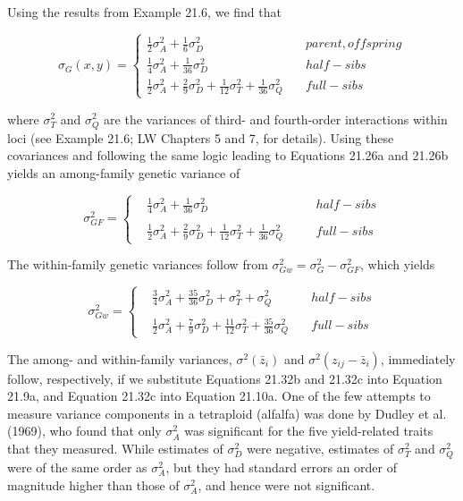 \documentclass{article}
\begin{document}
Using the results from Example 21.6, we find that

\begin{equation}
\sigma_{G}(x,y)=\left\{\begin{array}{ll}\frac{1}{2}\sigma_{A}^{2}+\frac{1}{6}\sigma_{D}^{2}&\quad parent,offspring\\\frac{1}{4}\sigma_{A}^{2}+\frac{1}{36}\sigma_{D}^{2}&\quad half-sibs\\\frac{1}{2}\sigma_{A}^{2}+\frac{2}{9}\sigma_{D}^{2}+\frac{1}{12}\sigma_{T}^{2}+\frac{1}{36}\sigma_{Q}^{2}&\quad full-sibs\end{array}\right.
\tag{21.32a}
\label{eq:21_32a}
\end{equation}

where  $ \sigma_{T}^{2} $ and  $ \sigma_{Q}^{2} $ are the variances of third- and fourth-order interactions within loci (see Example 21.6; LW Chapters 5 and 7, for details). Using these covariances and following the same logic leading to Equations 21.26a and 21.26b yields an among-family genetic variance of

\begin{equation}
\sigma_{GF}^{2}=\left\{\begin{aligned}&\frac{1}{4}\sigma_{A}^{2}+\frac{1}{36}\sigma_{D}^{2}&\quad&half-sibs\\ &\\ &\frac{1}{2}\sigma_{A}^{2}+\frac{2}{9}\sigma_{D}^{2}+\frac{1}{12}\sigma_{T}^{2}+\frac{1}{36}\sigma_{Q}^{2}&\quad&full-sibs\end{aligned}\right.
\tag{21.32b}
\label{eq:21_32b}
\end{equation}

The within-family genetic variances follow from  $ \sigma_{Gw}^{2} = \sigma_{G}^{2} - \sigma_{GF}^{2} $, which yields

\begin{equation}
\sigma_{Gw}^{2}=\left\{\begin{aligned}&\frac{3}{4}\sigma_{A}^{2}+\frac{35}{36}\sigma_{D}^{2}+\sigma_{T}^{2}+\sigma_{Q}^{2}\quad&half-sibs\\ &\\ &\frac{1}{2}\sigma_{A}^{2}+\frac{7}{9}\sigma_{D}^{2}+\frac{11}{12}\sigma_{T}^{2}+\frac{35}{36}\sigma_{Q}^{2}\quad&full-sibs\end{aligned}\right.
\tag{21.32c}
\label{eq:21_32c}
\end{equation}

The among- and within-family variances,  $ \sigma^2(\bar{z}_i) $ and  $ \sigma^2(z_{ij} - \bar{z}_i) $, immediately follow, respectively, if we substitute Equations 21.32b and 21.32c into Equation 21.9a, and Equation 21.32c into Equation 21.10a. One of the few attempts to measure variance components in a tetraploid (alfalfa) was done by Dudley et al. (1969), who found that only  $ \sigma_A^2 $ was significant for the five yield-related traits that they measured. While estimates of  $ \sigma_D^2 $ were negative, estimates of  $ \sigma_T^2 $ and  $ \sigma_Q^2 $ were of the same order as  $ \sigma_A^2 $, but they had standard errors an order of magnitude higher than those of  $ \sigma_A^2 $, and hence were not significant.
\end{document}
